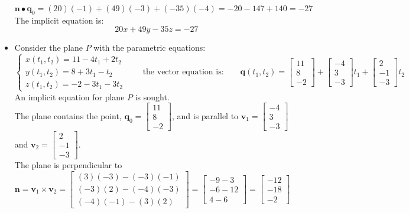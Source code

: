 \documentclass{article}
\begin{document}
\begin{itemize}
\(\mathbf{n} \bullet \mathbf{q}_0 = (20)(-1) + (49)(-3) + (-35)(-4) = -20 - 147 + 140 = -27\) \\ 
The implicit equation is:
\[20x + 49y - 35z = -27\]
\item Consider the plane \(P\) with the parametric equations: 
\[\left\{\begin{array}{c} x(t_1, t_2) = 11 - 4t_1 + 2t_2 \\ y(t_1, t_2) = 8 + 3t_1 - t_2 \\ z(t_1, t_2) = -2 - 3t_1 - 3t_2 \end{array}\right.
\quad\quad\text{the vector equation is:}\quad\quad
\mathbf{q}(t_1, t_2) = \begin{bmatrix} 11 \\ 8 \\ -2 \end{bmatrix} + \begin{bmatrix} -4 \\ 3 \\ -3 \end{bmatrix}t_1 + \begin{bmatrix} 2 \\ -1 \\ -3 \end{bmatrix}t_2\]
An implicit equation for plane \(P\) is sought. \\  
The plane contains the point, \(\mathbf{q}_0 = \begin{bmatrix} 11 \\ 8 \\ -2 \end{bmatrix}\), and is parallel to \(\mathbf{v}_1 = \begin{bmatrix} -4 \\ 3 \\ -3 \end{bmatrix}\) and \(\mathbf{v}_2 = \begin{bmatrix} 2 \\ -1 \\ -3 \end{bmatrix}\). \\
The plane is perpendicular to \(\mathbf{n} = \mathbf{v}_1 \times \mathbf{v}_2 = \begin{bmatrix} (3)(-3) - (-3)(-1) \\ (-3)(2) - (-4)(-3) \\ (-4)(-1) - (3)(2) \end{bmatrix} = \begin{bmatrix} -9 - 3 \\ -6 - 12 \\ 4 - 6 \end{bmatrix} = \begin{bmatrix} -12 \\ -18 \\ -2 \end{bmatrix}\) \\  

\end{itemize}
\end{document}
